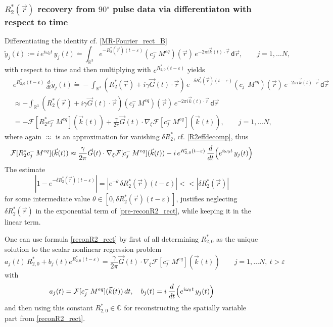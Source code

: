 \documentclass{ws-m3as}
\newcommand\taup{\varepsilon}
\begin{document}
\subsubsection*{$R_2^*(\vec r)$ recovery from $90{}^{\circ}$ pulse data via differentiaton with respect to time}
Differentiating the identity cf. \eqref{MR-Fourier_rect_B} 
\[
\tilde{y}_j(t):=i\,e^{i\omega_0t} \, y_j(t) 
\dot{=} \int_{\mathbb{R}^3} e^{-R_2^*(\vec r)(t-\taup)} (c^-_j\,M^{eq})(\vec r) \, e^{-2\pi i {\vec k}(t)\cdot{\vec r}}  \,\textsf{d}\vec r
,\qquad j=1,\ldots N,
\]
with respect to time and then multiplying with $e^{R_{2,0}^*(t-\taup)}$ yields
\begin{equation}\label{pre-reconR2_rect}
\begin{aligned}
&e^{R_{2,0}^*(t-\taup)}\, \frac{d}{dt}\tilde{y}_j(t)
\dot{=} -\int_{\mathbb{R}^3} (R_2^*(\vec r)+i\gamma {\vec G}(t)\cdot{\vec r})\,e^{-\delta R_2^*(\vec r)(t-\taup)} (c^-_j\,M^{eq})(\vec r) \, e^{-2\pi i {\vec k}(t)\cdot{\vec r}}  \,\textsf{d}\vec r\\
&\approx
 -\int_{\mathbb{R}^3} (R_2^*(\vec r)+i\gamma {\vec G}(t)\cdot{\vec r}) (c^-_j\,M^{eq})(\vec r) \, e^{-2\pi i {\vec k}(t)\cdot{\vec r}}  \,\textsf{d}\vec r\\
&=-\mathcal{F}[R_2^*c^-_j\,M^{eq}]({\vec k}(t))
+\frac{\gamma}{2\pi} {\vec G}(t)\cdot\nabla_\xi \mathcal{F}[c^-_j\,M^{eq}]({\vec k}(t))
,\qquad j=1,\ldots N,
\end{aligned}
\end{equation}
where again $\approx$ is an approximation for vanishing $\delta R_2^*$, cf. \eqref{R2effdecomp},
thus
\begin{equation}\label{reconR2_rect}
\mathcal{F}[R_2^*c^-_j\,M^{eq}]({\vec k}(t))
\approx \frac{\gamma}{2\pi} {\vec G}(t)\cdot\nabla_\xi \mathcal{F}[c^-_j\,M^{eq}]({\vec k}(t))
-i\,e^{R_{2,0}^*(t-\taup)}\, \frac{d}{dt}\Bigl(e^{i\omega_0t} \, y_j(t)\Bigr)
\end{equation}
The estimate
\[
|1-e^{-\delta R_2^*(\vec r)(t-\taup)}|=
|e^{-\theta}\,\delta R_2^*(\vec r)(t-\taup)|<<|\delta R_2^*(\vec r)|
\]
for some intermediate value $\theta\in[0,\delta R_2^*(\vec r)(t-\taup)]$, justifies neglecting $\delta R_2^*(\vec r)$ in the exponential term of \eqref{pre-reconR2_rect}, while keeping it in the linear term. 

One can use formula \eqref{reconR2_rect} by first of all determining $R_{2,0}^*$ as the unique solution to the scalar nonlinear regression problem 
\[
a_j(t)\, R_{2,0}^* + b_j(t) e^{R_{2,0}^*(t-\taup)}= \frac{\gamma}{2\pi} {\vec G}(t)\cdot\nabla_\xi \mathcal{F}[c^-_j\,M^{eq}]({\vec k}(t))\qquad j=1,\ldots N, \ t>\taup
\] 
with 
\[
a_j(t)=\mathcal{F}[c^-_j\,M^{eq}]({\vec k}(t))\,dt, \quad
b_j(t)= i \, \frac{d}{dt}\Bigl(e^{i\omega_0t} \, y_j(t)\Bigr)
\]
and then using this constant $R_{2,0}^*\in\mathbb{C}$ for reconstructing the spatially variable part from \eqref{reconR2_rect}.
\end{document}

